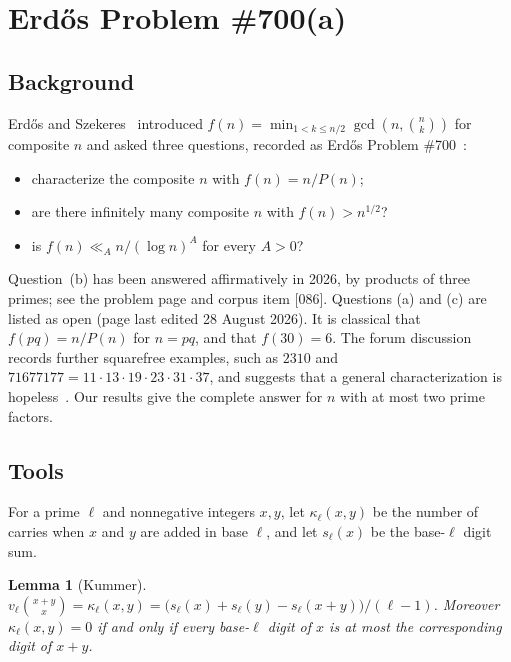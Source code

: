 \documentclass[11pt,a4paper]{article}
\newtheorem{lemma}[theorem]{Lemma}
\theoremstyle{definition}
\begin{document}
\tableofcontents

\section{Erd\H{o}s Problem \#700(a)}

\subsection{Background}
Erd\H{o}s and Szekeres~\cite{ErSz78} introduced
$f(n)=\min_{1<k\le n/2}\gcd(n,\binom nk)$ for composite $n$ and asked three questions,
recorded as Erd\H{o}s Problem \#700~\cite{EP700}:
\begin{itemize}
\item[(a)] characterize the composite $n$ with $f(n)=n/P(n)$;
\item[(b)] are there infinitely many composite $n$ with $f(n)>n^{1/2}$?
\item[(c)] is $f(n)\ll_A n/(\log n)^A$ for every $A>0$?
\end{itemize}
Question~(b) has been answered affirmatively in 2026, by products of three primes; see the
problem page and corpus item [086]. Questions (a) and (c) are listed as open (page last
edited 28 August 2026). It is classical that $f(pq)=n/P(n)$ for $n=pq$, and that $f(30)=6$.
The forum discussion records further squarefree examples, such as $2310$ and
$71677177=11\cdot13\cdot19\cdot23\cdot31\cdot37$, and suggests that a general
characterization is hopeless~\cite{EP700}. Our results give the complete answer for $n$
with at most two prime factors.

\subsection{Tools}
For a prime $\ell$ and nonnegative integers $x,y$, let $\kappa_\ell(x,y)$ be the number of
carries when $x$ and $y$ are added in base $\ell$, and let $s_\ell(x)$ be the base-$\ell$
digit sum.

\begin{lemma}[Kummer]\label{lem:kummer}
$v_\ell\binom{x+y}{x}=\kappa_\ell(x,y)=\bigl(s_\ell(x)+s_\ell(y)-s_\ell(x+y)\bigr)/(\ell-1)$.
Moreover $\kappa_\ell(x,y)=0$ if and only if every base-$\ell$ digit of $x$ is at most the
corresponding digit of $x+y$.
\end{lemma}
\end{document}
